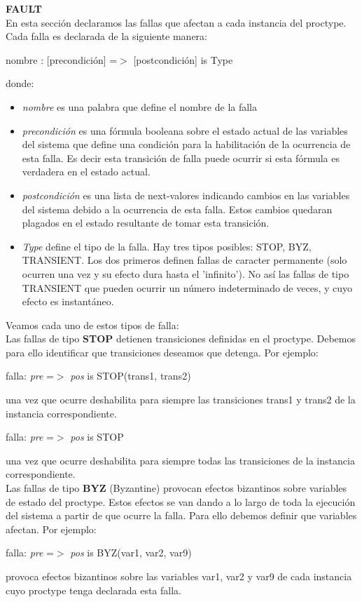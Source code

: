 \documentclass[titlepage, 12pt]{book}
\begin{document}
\noindent \textbf{FAULT}\\
\indent En esta secci\'on declaramos las fallas que afectan a cada instancia del proctype. Cada falla es declarada de la siguiente manera:

\begin{center}nombre : [precondici\'on] =$>$ [postcondici\'on] is Type \end{center}
donde:
\begin{itemize}
\item \textit{nombre} es una palabra que define el nombre de la falla
\item \textit{precondici\'on} es una f\'ormula booleana sobre el estado actual de las variables del sistema que define una condici\'on para la habilitaci\'on de la ocurrencia de esta falla. Es decir esta transici\'on de falla puede ocurrir si esta f\'ormula es verdadera en el estado actual.
\item \textit{postcondici\'on} es una lista de next-valores indicando cambios en las variables del sistema debido a la ocurrencia de esta falla. Estos cambios quedaran plagados en el estado resultante de tomar esta transici\'on.
\item \textit{Type} define el tipo de la falla. Hay tres tipos posibles: STOP, BYZ, TRANSIENT. Los dos primeros definen fallas de caracter permanente (solo ocurren una vez y su efecto dura hasta el 'infinito'). No as\'i las fallas de tipo TRANSIENT que pueden ocurrir un n\'umero indeterminado de veces, y cuyo efecto es instant\'aneo.\\
\end{itemize}
Veamos cada uno de estos tipos de falla:\\

	Las fallas de tipo \textbf{STOP} detienen transiciones definidas en el proctype. Debemos para ello identificar que transiciones deseamos que detenga. Por ejemplo:
\begin{center}falla: \textit{pre} =$>$ \textit{pos} is STOP(trans1, trans2)\end{center}
una vez que ocurre deshabilita para siempre las transiciones trans1 y trans2 de la instancia correspondiente.
\begin{center}falla: \textit{pre} =$>$ \textit{pos} is STOP\end{center}
una vez que ocurre deshabilita para siempre todas las transiciones de la instancia correspondiente.\\

Las fallas de tipo \textbf{BYZ} (Byzantine) provocan efectos bizantinos sobre variables de estado del proctype. Estos efectos se van dando a lo largo de toda la ejecuci\'on del sistema a partir de que ocurre la falla. Para ello debemos definir que variables afectan. Por ejemplo:
\begin{center}falla: \textit{pre} =$>$ \textit{pos} is BYZ(var1, var2, var9) \end{center}
provoca efectos bizantinos sobre las variables var1, var2 y var9 de cada instancia cuyo proctype tenga declarada esta falla.\\
\end{document}
